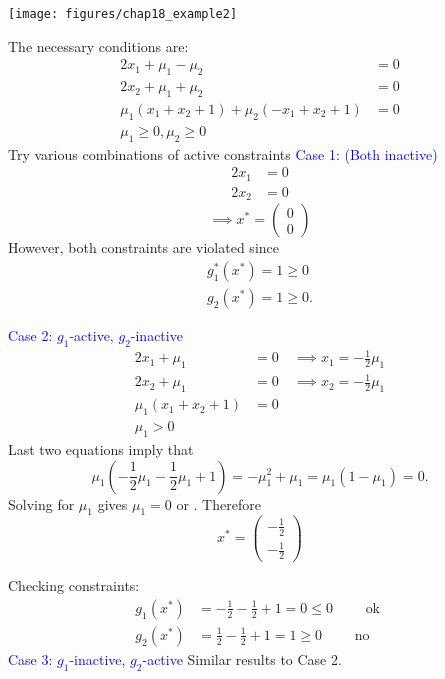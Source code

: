 \documentclass{article}
\begin{document}
	\begin{center}
		\texttt{[image: figures/chap18\_example2]}
	\end{center}

	The necessary conditions are:
	\begin{align*}
		2x_1 + \mu_1 - \mu_2 &= 0\\
		2x_2 + \mu_1 + \mu_2 &= 0\\
		\mu_1(x_1 + x_2 + 1) + \mu_2(-x_1 + x_2 + 1) &= 0\\
		\mu_1 \geq 0, \mu_2 \geq 0
	\end{align*}	
	Try various combinations of active constraints
	\textcolor{blue}{Case 1: (Both inactive) }
	\begin{align*}
		2x_1 &= 0\\
		2x_2 &= 0
	\end{align*}
	\[ \implies x^{\ast} = \begin{pmatrix}
	    0\\0
	  \end{pmatrix}
	\]
	However, both constraints are violated since
	\begin{align*}
		g_1^{\ast}(x^{\ast}) = 1 \geq 0\\
		g_2(x^{\ast}) = 1 \geq 0.
	\end{align*}

	\textcolor{blue}{Case 2: $g_1$-active, $g_2$-inactive}
	\begin{align*}
		2x_1 + \mu_1 &= 0 \quad\implies x_1 = -\frac{1}{2}\mu_1 \\
		2x_2 + \mu_1 &= 0 \quad\implies x_2 = -\frac{1}{2}\mu_1\\
		\mu_1(x_1 + x_2 + 1) &= 0\\
		\mu_1 > 0
	\end{align*}
	Last two equations imply that
	\[ 
	\mu_1(-\frac{1}{2}\mu_1-\frac{1}{2}\mu_1 + 1) = -\mu_1^2 + \mu_1 = \mu_1(1-\mu_1) = 0.
	\]
	Solving for $\mu_1$ gives $\mu_1 = 0$ or .
	Therefore 
	\[
		x^{\ast} = 
			\begin{pmatrix}
	    		-\frac{1}{2} \\
	    		-\frac{1}{2}
	  		\end{pmatrix}
	\]	

	Checking constraints:
	\begin{align*}
		g_1(x^{\ast}) &= -\frac{1}{2} -\frac{1}{2} + 1 = 0 \leq 0 \qquad \text{ ok }\\
		g_2(x^{\ast}) &= \frac{1}{2} -\frac{1}{2} + 1 = 1 \geq 0 \qquad \text{ no }
	\end{align*}	
	\textcolor{blue}{Case 3: $g_1$-inactive, $g_2$-active}
	 Similar results to Case 2.
	 
\end{document}
